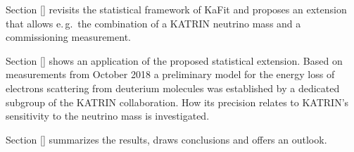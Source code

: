 Section \ref{} revisits the statistical framework of KaFit and proposes an extension that allows e.\,g.~the combination of a KATRIN neutrino mass and a commissioning measurement.

Section \ref{} shows an application of the proposed statistical extension. Based on measurements from October 2018 a preliminary model for the energy loss of electrons scattering from deuterium molecules was established by a dedicated subgroup of the KATRIN collaboration. How its precision relates to KATRIN's sensitivity to the neutrino mass is investigated.

Section \ref{} summarizes the results, draws conclusions and offers an outlook.
